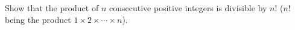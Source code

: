 Show that the product of $n$ consecutive positive integers is divisible by $n!$ ($n!$ being the product $1 \times 2 \times \cdots \times n$).
